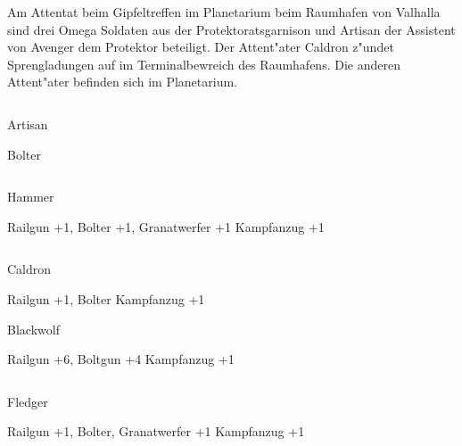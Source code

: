 
Am Attentat beim Gipfeltreffen im Planetarium beim Raumhafen von Valhalla sind drei Omega Soldaten aus der Protektoratsgarnison und Artisan der Assistent von Avenger dem Protektor beteiligt. Der Attent"ater Caldron z"undet Sprengladungen auf im Terminalbewreich des Raumhafens. Die anderen Attent"ater befinden sich im Planetarium.

\begin{column}[l]{0.45}
    \begin{nscsheet}[h]{Artisan}
        \nscstats[ATT=2,AGG=2,DEX=2,COM=3]
        \nscruler
        \begin{nscinventory}
            \nscitem[Waffen] Bolter
        \end{nscinventory}
    \end{nscsheet}
\end{column}
\begin{column}[r]{0.45}
    \begin{nscsheet}[h]{Hammer}
        \nscstats[ATT=2,AGG=3,CON=2]
        \nscruler
        \begin{nscinventory}
            \nscitem[Waffen] Railgun +1, Bolter +1, Granatwerfer +1
            \nscitem[R"ustung] Kampfanzug +1       
        \end{nscinventory}
    \end{nscsheet}
\end{column}
\vfill\pagebreak

\begin{column}[l]{0.45}
    \begin{nscsheet}[h]{Caldron}
        \nscstats[ATT=2,AGG=3,CON=2]
        \nscruler
        \begin{nscinventory}
            \nscitem[Waffen] Railgun +1, Bolter
            \nscitem[R"ustung] Kampfanzug +1
        \end{nscinventory}
    \end{nscsheet}

    \begin{nscsheet}[h]{Blackwolf}
        \nscstats[ATT=2,AGG=3,CON=2]
        \nscruler
        \begin{nscinventory}
            \nscitem[Waffen] Railgun +6, Boltgun +4
            \nscitem[R"ustung] Kampfanzug +1
        \end{nscinventory}
    \end{nscsheet}    
\end{column}
\begin{column}[r]{0.45}
    \begin{nscsheet}[h]{Fledger}
        \nscstats[ATT=2,AGG=3,CON=2]
        \nscruler
        \begin{nscinventory}
            \nscitem[Waffen] Railgun +1, Bolter, Granatwerfer +1
            \nscitem[R"ustung] Kampfanzug +1
        \end{nscinventory}
    \end{nscsheet}        
\end{column}

